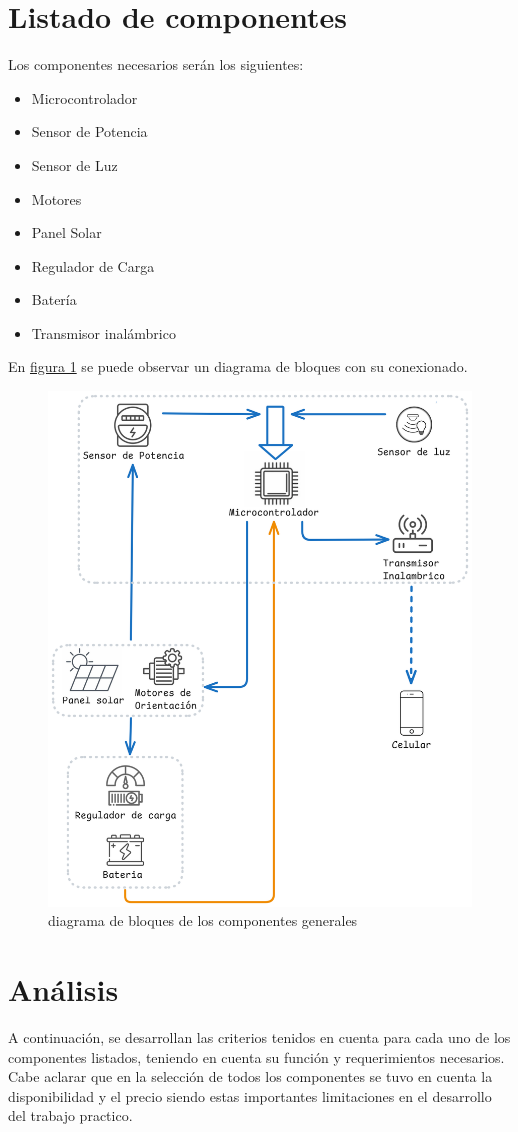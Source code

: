\documentclass[a4paper,12pt]{article}
\begin{document}
\section{Listado de componentes}
Los componentes necesarios serán los siguientes: 
\begin{itemize}
\item Microcontrolador
\item Sensor de Potencia
\item Sensor de Luz
\item Motores
\item Panel Solar
\item Regulador de Carga
\item Batería
\item Transmisor inalámbrico
\end{itemize}

En \hyperref[fig:diagrama]{figura 1} se puede observar un diagrama de bloques con su conexionado. 

\begin{figure}[H]
    \centering
    \includegraphics[width=0.75\linewidth]{diagrama_proyecto.png}
    \caption{ diagrama de bloques de los componentes generales}
    \label{fig:diagrama}
\end{figure}

\section{Análisis}
A continuación, se desarrollan las criterios tenidos en cuenta para cada uno de los componentes listados, teniendo en cuenta su función y requerimientos necesarios. Cabe aclarar que en la selección de todos los componentes se tuvo en cuenta la disponibilidad y el precio siendo estas importantes limitaciones en el desarrollo del trabajo practico.
\end{document}
